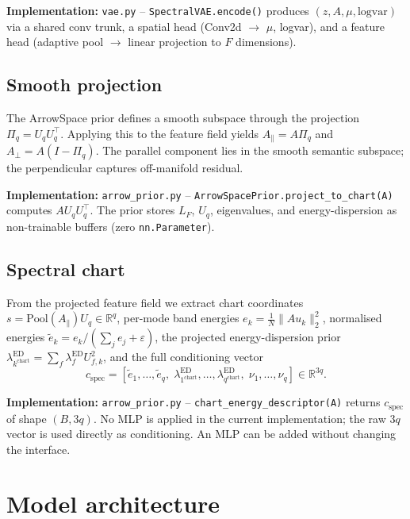 \documentclass[11pt]{article}
\newcommand{\Uq}{U_q}
\newcommand{\ed}{\lambda^{\mathrm{ED}}}
\newcommand{\R}{\mathbb{R}}
\begin{document}
    \noindent\textbf{Implementation:} \texttt{vae.py} --
    \texttt{SpectralVAE.encode()} produces $(z, A, \mu, \mathrm{logvar})$ via
    a shared conv trunk, a spatial head (Conv2d $\to$ $\mu$, logvar), and a
    feature head (adaptive pool $\to$ linear projection to $F$ dimensions).

    \subsection{Smooth projection}
    \label{sec:smooth_projection}
    The ArrowSpace prior defines a smooth subspace through the
    projection $\Pi_q = \Uq \Uq^\top$. Applying this to the feature
    field yields $A_{\parallel} = A \Pi_q$ and $A_{\perp} = A(I -
    \Pi_q)$. The parallel component lies in the smooth semantic
    subspace; the perpendicular captures off-manifold residual.

    \noindent\textbf{Implementation:} \texttt{arrow\_prior.py} --
    \texttt{ArrowSpacePrior.project\_to\_chart(A)} computes $A \Uq
    \Uq^\top$. The prior stores $L_F$, $U_q$, eigenvalues, and
    energy-dispersion as non-trainable buffers (zero
    \texttt{nn.Parameter}).

    \subsection{Spectral chart}
    \label{sec:spectral_chart}
    From the projected feature field we extract chart coordinates
    $s = \mathrm{Pool}(A_{\parallel}) \Uq \in \R^q$, per-mode band
    energies $e_k = \frac{1}{N}\|A u_k\|_2^2$, normalised energies
    $\tilde e_k = e_k / (\sum_j e_j + \varepsilon)$, the projected
    energy-dispersion prior $\ed_{k^{\mathrm{chart}}} = \sum_f \ed_f
    U_{f,k}^2$, and the full conditioning vector
    \[c_{\mathrm{spec}} = [\tilde e_1,\ldots,\tilde e_q,\;
    \ed_{1^{\mathrm{chart}}},\ldots,\ed_{q^{\mathrm{chart}}},\;
    \nu_1,\ldots,\nu_q] \in \R^{3q}.\]

    \noindent\textbf{Implementation:} \texttt{arrow\_prior.py} --
    \texttt{chart\_energy\_descriptor(A)} returns $c_{\mathrm{spec}}$
    of shape $(B, 3q)$. No MLP is applied in the current
    implementation; the raw $3q$ vector is used directly as
    conditioning. An MLP can be added without changing the interface.

    \section{Model architecture}
    \label{sec:model}
\end{document}
